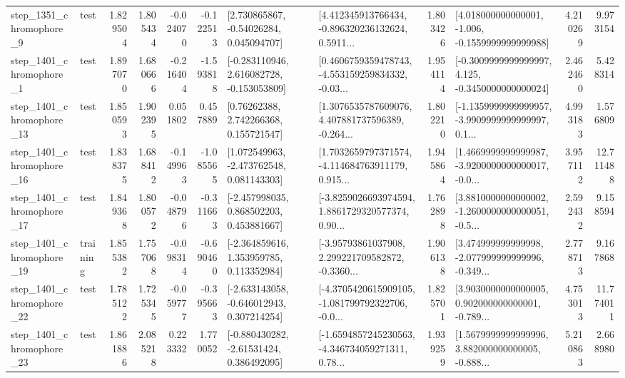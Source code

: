 \begin{tabular}{llrrrrllrlrr}
  step\_1351\_chromophore\_9 &      test &      1.829504 &    1.805434 &     -0.024070 & -0.122513 &     [2.730865867, -0.54026284, 0.045094707] &  [4.412345913766434, -0.896320236132624, 0.5911... &       1.803426 &   [4.018000000000001, -1.006, -0.1559999999999988] &            4.210269 &          9.973154 \\
  step\_1401\_chromophore\_1 &      test &      1.897070 &    1.680666 &     -0.216404 & -1.593818 &   [-0.283110946, 2.616082728, -0.153053809] &  [0.4606759359478743, -4.553159259834332, -0.03... &       1.954114 &  [-0.3009999999999997, 4.125, -0.3450000000000024] &            2.462460 &          5.428314 \\
 step\_1401\_chromophore\_13 &      test &      1.850593 &    1.902395 &      0.051802 &  0.457889 &      [0.76262388, 2.742266368, 0.155721547] &  [1.3076535787609076, 4.407881737596389, -0.264... &       1.802210 &  [-1.1359999999999957, -3.9909999999999997, 0.1... &            4.993183 &          1.576809 \\
 step\_1401\_chromophore\_16 &      test &      1.838375 &    1.688412 &     -0.149963 & -1.085565 &    [1.072549963, -2.473762548, 0.081143303] &  [1.7032659797371574, -4.114684763911179, 0.915... &       1.945864 &  [1.4669999999999987, -3.9200000000000017, -0.0... &            3.957112 &         12.711488 \\
 step\_1401\_chromophore\_17 &      test &      1.849368 &    1.800572 &     -0.048796 & -0.311663 &    [-2.457998035, 0.868502203, 0.453881667] &  [-3.8259026693974594, 1.8861729320577374, 0.90... &       1.762898 &  [3.8810000000000002, -1.2600000000000051, -0.5... &            2.592432 &          9.158594 \\
 step\_1401\_chromophore\_19 &  training &      1.855382 &    1.757068 &     -0.098314 & -0.690460 &    [-2.364859616, 1.353959785, 0.113352984] &  [-3.95793861037908, 2.299221709582872, -0.3360... &       1.906138 &  [3.474999999999998, -2.077999999999996, -0.349... &            2.778713 &          9.167868 \\
 step\_1401\_chromophore\_22 &      test &      1.785122 &    1.725345 &     -0.059777 & -0.395663 &   [-2.633143058, -0.646012943, 0.307214254] &  [-4.3705420615909105, -1.081799792322706, -0.0... &       1.825701 &  [3.9030000000000005, 0.902000000000001, -0.789... &            4.753013 &         11.774011 \\
 step\_1401\_chromophore\_23 &      test &      1.861886 &    2.085218 &      0.223332 &  1.770052 &    [-0.880430282, -2.61531424, 0.386492095] &  [-1.6594857245230563, -4.346734059271311, 0.78... &       1.939259 &  [1.5679999999999996, 3.882000000000005, -0.888... &            5.210863 &          2.668980 \\

\end{tabular}
